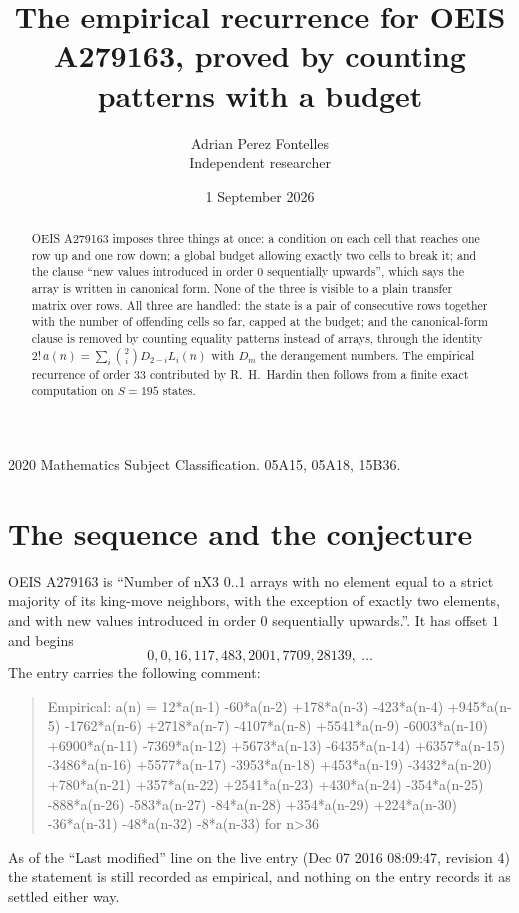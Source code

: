 \documentclass[11pt,a4paper]{article}
\title{The empirical recurrence for OEIS A279163, proved by counting patterns with a budget}
\author{Adrian Perez Fontelles\\ \small Independent researcher}
\date{1 September 2026}
\theoremstyle{plain}
\theoremstyle{definition}
\begin{document}
\maketitle

\begin{abstract}
OEIS A279163 imposes three things at once: a condition on each cell that reaches one row up and
one row down; a global budget allowing exactly two cells to
break it; and the clause ``new values introduced in order $0$ sequentially upwards'', which
says the array is written in canonical form. None of the three is visible to a plain transfer
matrix over rows. All three are handled: the state is a pair of consecutive rows
together with the number of offending cells so far, capped at the budget; and the
canonical-form clause is removed by counting equality patterns instead of arrays, through the
identity $2!\,a(n)=\sum_i\binom{2}{i}D_{2-i}L_i(n)$ with $D_m$ the derangement
numbers. The empirical recurrence of order $33$ contributed by R.~H.~Hardin then follows
from a finite exact computation on $S=195$ states.
\end{abstract}

\noindent\small 2020 Mathematics Subject Classification. 05A15, 05A18, 15B36.\normalsize

\section{The sequence and the conjecture}

OEIS A279163 is ``Number of nX3 0..1 arrays with no element equal to a strict majority of its king-move neighbors, with the exception of exactly two elements, and with new values introduced in order 0 sequentially upwards.''. It has offset $1$ and begins
\[
0, 0, 16, 117, 483, 2001, 7709, 28139,\ \dots
\]
The entry carries the following comment:
\begin{quote}\small
Empirical: a(n) = 12*a(n-1) -60*a(n-2) +178*a(n-3) -423*a(n-4) +945*a(n-5) -1762*a(n-6) +2718*a(n-7) -4107*a(n-8) +5541*a(n-9) -6003*a(n-10) +6900*a(n-11) -7369*a(n-12) +5673*a(n-13) -6435*a(n-14) +6357*a(n-15) -3486*a(n-16) +5577*a(n-17) -3953*a(n-18) +453*a(n-19) -3432*a(n-20) +780*a(n-21) +357*a(n-22) +2541*a(n-23) +430*a(n-24) -354*a(n-25) -888*a(n-26) -583*a(n-27) -84*a(n-28) +354*a(n-29) +224*a(n-30) -36*a(n-31) -48*a(n-32) -8*a(n-33) for n>36
\end{quote}
As of the ``Last modified'' line on the live entry (Dec 07 2016 08:09:47, revision 4) the statement is
still recorded as empirical, and nothing on the entry records it as settled either way.
\end{document}
